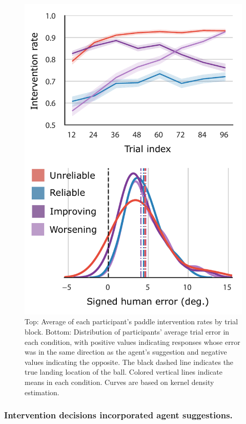 \documentclass[10pt,letterpaper]{article}
\begin{document}
\begin{figure}[t]
\begin{center}
\includegraphics[width=0.9\linewidth]{img/error_interventions_combined.pdf}
\end{center}
\caption{
Top: Average of each participant's paddle intervention rates by trial block. 
Bottom: Distribution of participants' average trial error in each condition, with positive values indicating responses whose error was in the same direction as the agent's suggestion and negative values indicating the opposite. The black dashed line indicates the true landing location of the ball. Colored vertical lines indicate means in each condition. Curves are based on kernel density estimation.}
\label{fig:interventions}
\end{figure}



\subsubsection{Intervention decisions incorporated agent suggestions.}
\end{document}
